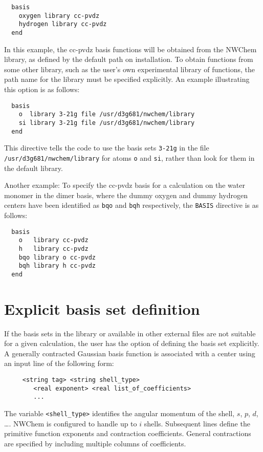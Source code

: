 \begin{verbatim}
  basis
    oxygen library cc-pvdz
    hydrogen library cc-pvdz
  end
\end{verbatim}

In this example, the cc-pvdz basis functions will be obtained from the
NWChem library, as defined by the default path on installation.  To obtain
functions from some other library, such as the user's own experimental
library of functions, the path name for the library must be specified
explicitly.  An example illustrating this option is as follows:

\begin{verbatim}
  basis
    o  library 3-21g file /usr/d3g681/nwchem/library
    si library 3-21g file /usr/d3g681/nwchem/library
  end
\end{verbatim}

This directive tells the code to use the basis sets \verb+3-21g+ in
the file {\tt /usr/\-d3g681/\-nwchem/\-library} for atoms \verb+o+ and
\verb+si+, rather than look for them in the default library.

Another example:  To specify the cc-pvdz basis for a calculation on
the water monomer in the dimer basis, where the dummy oxygen and dummy
hydrogen centers have been identified as \verb+bqo+ and \verb+bqh+
respectively, the \verb+BASIS+ directive is as follows:

\begin{verbatim}
  basis
    o   library cc-pvdz
    h   library cc-pvdz
    bqo library o cc-pvdz
    bqh library h cc-pvdz
  end
\end{verbatim}

\section{Explicit basis set definition}

If the basis sets in the library or available in other external files
are not suitable for a given calculation, the user has the option
of defining the basis set explicitly.
A generally contracted Gaussian basis function is associated with a
center using an input line of the following form:
\begin{verbatim}
     <string tag> <string shell_type>
        <real exponent> <real list_of_coefficients>
        ...
\end{verbatim}

The variable \verb+<shell_type>+ identifies the angular momentum of the shell,
$s$, $p$, $d$, \ldots.  NWChem is configured to handle up
to $i$ shells.  Subsequent lines define the primitive function
exponents and contraction coefficients.  General contractions are
specified by including multiple columns of coefficients.

